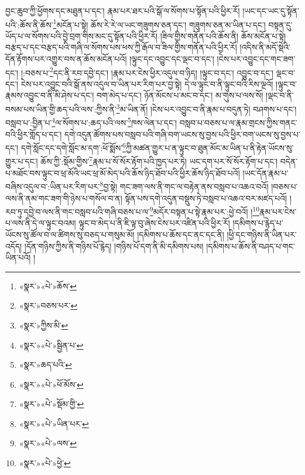 བྱང་ཆུབ་ཀྱི་ཕྱོགས་དང་མཐུན་པ་དང་། རྣམ་པར་ཐར་པའི་སྒོ་ལ་སོགས་པ་སྟོན་པའི་ཕྱིར་རོ། །ཡང་དང་ཡང་དུ་སྟོན་པའི་:ཆོས་ནི་ཆོས་\footnote{«སྣར་»«པེ་»ཆོས་}མངོན་པ་སྟེ། ཆོས་རེ་རེ་ལ་ཡང་གཟུགས་ཅན་དང་། གཟུགས་ཅན་མ་ཡིན་པ་དང་། བསྟན་དུ་ཡོད་པ་ལ་སོགས་པའི་བྱེ་བྲག་གིས་མང་དུ་སྟོན་པའི་ཕྱིར་རོ། །ཟིལ་གྱིས་གནོན་པའི་ཆོས་ནི། ཆོས་མངོན་པ་སྟེ། བརྩད་པ་དང་བརྩད་པའི་གཞི་ལ་སོགས་པས་ཕས་ཀྱི་རྒོལ་བ་ཟིལ་གྱིས་གནོན་པའི་ཕྱིར་རོ། །འདིས་ནི་མདོ་སྡེའི་དོན་རྟོགས་པར་འགྱུར་བས་ན་ཆོས་མངོན་པའོ། །ལྟུང་དང་འབྱུང་དང་ལྡང་བ་དང་། །ངེས་པར་འབྱུང་དང་གང་ཟག་དང་། །:བཅས་པ་\footnote{«སྣར་»བཅས་པར་}དང་ནི་རབ་དབྱེ་དང་། །རྣམ་པར་ངེས་ཕྱིར་འདུལ་བ་ཉིད། །ལྟུང་བ་དང་། འབྱུང་བ་དང་། ལྡང་བ་དང་། ངེས་པར་འབྱུང་བའི་སྒོ་ནས་འདུལ་བ་ཡིན་པར་རིག་པར་བྱ་སྟེ། དེ་ལ་ལྟུང་བ་ནི་ལྟུང་བའི་རིས་ལྔའོ། །ལྟུང་བ་རྣམས་འབྱུང་བ་ནི་མི་ཤེས་པ་དང་། བག་མེད་པ་དང་། ཉོན་མོངས་པ་མང་བ་དང་། མ་གུས་པ་ལས་སོ། །ལྡང་བ་ནི་བསམ་པས་ཡིན་གྱི་ཆད་པའི་ལས་:ཀྱིས་ནི་\footnote{«སྣར་»ཀྱིས་མི་}མ་ཡིན་ནོ། །ངེས་པར་འབྱུང་བ་ནི་རྣམ་པ་བདུན་ཏེ། བཤགས་པ་དང་། བསླབ་པ་:བྱིན་པ་\footnote{«སྣར་»«པེ་»སྦྱིན་པ་}ལ་སོགས་པ་:ཆད་པའི་ལས་\footnote{«སྣར་»ཆད་པའི་}ཁས་ལེན་པ་དང་། བསླབ་པ་བཅས་པ་ལ་རྣམ་གྲངས་ཀྱིས་གནང་བའི་ཕྱིར་གློད་པ་དང་། དགེ་འདུན་ཚོགས་པས་བསླབ་པའི་གཞི་བག་ཡངས་སུ་བྱས་པའི་ཕྱིར་བག་ཡངས་སུ་བྱས་པ་དང་། དགེ་སློང་དང་དགེ་སློང་མ་དག་:ཕོ་སྨོས་\footnote{«སྣར་»«པེ་»ཕོ་མོས་}ཀྱི་མཚན་གྱུར་པ་ན་ལྟུང་བ་ཐུན་མོང་མ་ཡིན་པ་ནི་རྟེན་ཡོངས་སུ་གྱུར་པ་དང་། ཆོས་ཀྱི་:སྡོམ་གྱིས་\footnote{«སྣར་»«པེ་»སྡོམ་གྱི་}རྣམ་པ་སོ་སོར་རྟོག་པའི་ཁྱད་པར་ཏེ། ཡང་དག་པར་སོ་སོར་རྟོག་པ་དང་། བདེན་པ་མཐོང་བས་ལྟུང་བ་ཕྲ་མོའི་ཡང་ཕྲ་མོ་མེད་པའི་ཆོས་ཉིད་ཐོབ་པའི་ཕྱིར་ཆོས་ཉིད་ཐོབ་པའོ། །ཡང་དོན་རྣམ་པ་བཞིས་འདུལ་བ་:ཡིན་པར་རིག་པར་\footnote{«སྣར་»«པེ་»ཡིན་པར་}བྱ་སྟེ། གང་ཟག་ལས་ནི་གང་ལ་བརྟེན་ནས་བསླབ་པ་འཆའ་བའོ། །བཅས་པ་ལས་ནི་ནམ་གང་ཟག་གི་ཉེས་པ་གསོལ་བ་ན། སྟོན་པས་དགེ་འདུན་བསྡུས་ཏེ་བསླབ་པ་འཆའ་བར་མཛད་པའོ། །རབ་ཏུ་དབྱེ་བ་ལས་ནི་གང་བསླབ་པའི་གཞི་བཅས་པ་ལ་\footnote{«སྣར་»«པེ་»ལས་}མདོར་བསྟན་པ་སྟེ་རྣམ་པར་:ཕྱེ་བའོ། །\footnote{«སྣར་»«པེ་»ཕྱེ་}རྣམ་པར་ངེས་པ་ལས་ནི་དེ་ལ་ལྟུང་བའམ། ལྟུང་བ་མེད་པ་ནི་ཇི་ལྟ་བུ་ཞེས་ངེས་པར་འཛིན་པའི་ཕྱིར་རོ། །དམིགས་པ་རྙེད་པ་ཡོངས་སུ་ཚོལ་བ་ལ་ཚིགས་སུ་བཅད་པ་གསུམ་མོ། །དམིགས་པ་ཆོས་དང་ནང་དང་ནི། །ཕྱི་དང་གཉིས་ནི་ཡིན་པར་འདོད། །དོན་གཉིས་ཀྱིས་ནི་གཉིས་པོ་རྙེད། །གཉིས་པོ་དག་ནི་མི་དམིགས་པས། །དམིགས་པ་ཆོས་ནི་བཤད་པ་གང་ཡིན་པའོ། །
